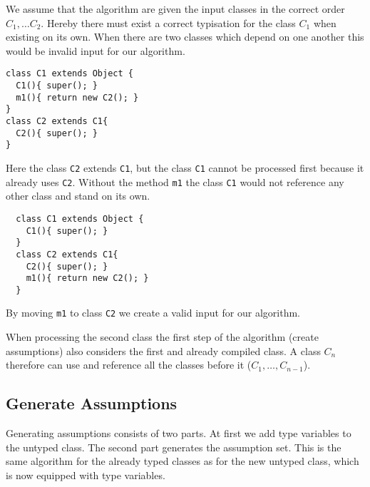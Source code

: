 \documentclass[acmsmall,screen,review]{acmart}
\begin{document}
We assume that the algorithm are given the input classes in the correct order $C_1, \ldots C_2$.
Hereby there must exist a correct typisation for the class $C_1$ when existing on its own.
When there are two classes which depend on one another this would be invalid input for our algorithm.
\begin{lstlisting}
class C1 extends Object {
  C1(){ super(); }
  m1(){ return new C2(); }
}
class C2 extends C1{
  C2(){ super(); }
}
\end{lstlisting}
Here the class \texttt{C2} extends \texttt{C1}, but the class \texttt{C1} cannot be processed first because it already uses \texttt{C2}.
Without the method \texttt{m1} the class \texttt{C1} would not reference any other class and stand on its own.
\begin{lstlisting}
  class C1 extends Object {
    C1(){ super(); }
  }
  class C2 extends C1{
    C2(){ super(); }
    m1(){ return new C2(); }
  }
  \end{lstlisting}
By moving \texttt{m1} to class \texttt{C2} we create a valid input for our algorithm.

When processing the second class the first step of the algorithm (create assumptions) also considers the first and already compiled class.
A class $C_n$ therefore can use and reference all the classes before it ($C_1, \ldots, C_{n-1}$).

\subsection{Generate Assumptions}


Generating assumptions consists of two parts.
At first we add type variables to the untyped class.
The second part generates the assumption set.
This is the same algorithm for the already typed classes as for the 
new untyped class, which is now equipped with type variables.
\end{document}
